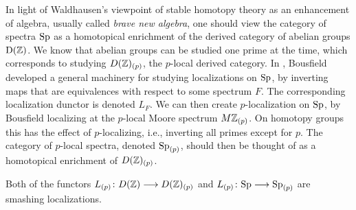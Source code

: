 In light of Waldhausen's viewpoint of stable homotopy theory as an enhancement of algebra, usually called \emph{brave new algebra}, one should view the category of spectra $\sp$ as a homotopical enrichment of the derived category of abelian groups $\Der(\Z)$. We know that abelian groups can be studied one prime at the time, which corresponds to studying $D(\Z)_{(p)}$, the $p$-local derived category. In \cite{bousfield_1979_localization}, Bousfield developed a general machinery for studying localizations on $\sp$, by inverting maps that are equivalences with respect to some spectrum $F$. The corresponding localization dunctor is denoted $L_F$. We can then create $p$-localization on $\sp$, by Bousfield localizing at the $p$-local Moore spectrum $M\Z_{(p)}$. On homotopy groups this has the effect of $p$-localizing, i.e., inverting all primes except for $p$. The category of $p$-local spectra, denoted $\sp_{(p)}$, should then be thought of as a homotopical enrichment of $D(\Z)_{(p)}$. 


\begin{remark}
    Both of the functors $L_{(p)}\colon D(\Z)\longrightarrow D(\Z)_{(p)}$ and $L_{(p)}\colon \sp\longrightarrow \sp_{(p)}$ are smashing localizations. 
\end{remark}



